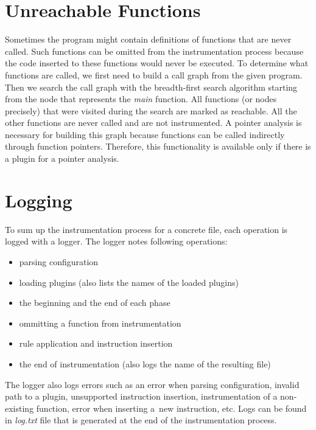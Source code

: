 \section{Unreachable Functions}

Sometimes the program might contain definitions of functions that are never
called. Such functions can be omitted from the instrumentation process because
the code inserted to these functions would never be executed. To determine what
functions are called, we first need to build a call graph from the given
program. Then we search the call graph with the breadth-first search algorithm
starting from the node that represents the \emph{main} function. All functions
(or nodes precisely) that were visited during the search are marked as
reachable. All the other functions are never called and are not instrumented. A
pointer analysis is necessary for building this graph because functions can be
called indirectly through function pointers. Therefore, this functionality is
available only if there is a plugin for a pointer analysis.

\section{Logging}

To sum up the instrumentation process for a concrete file, each operation is
logged with a logger. The logger notes following operations:
\begin{itemize}
  \item parsing configuration
  \item loading plugins (also lists the names of the loaded plugins)
  \item the beginning and the end of each phase
  \item ommitting a function from instrumentation
  \item rule application and instruction insertion
  \item the end of instrumentation (also logs the name of the resulting file)
\end{itemize}
The logger also logs errors such as an error when parsing configuration, invalid
path to a plugin, unsupported instruction insertion, instrumentation of a
non-existing function, error when inserting a~new instruction, etc. Logs can be
found in \emph{log.txt} file that is generated at the end of the
instrumentation process.

